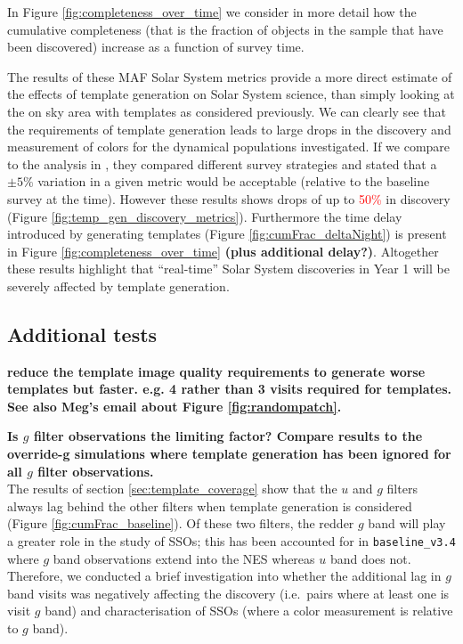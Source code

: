 \documentclass[preprint,linenumbers]{aastex631}
\newcommand{\baseline}{\texttt{baseline\_v3.4}\xspace}
\providecommand{\red}[1]{\textcolor{red}{#1}}
\begin{document}
{		In Figure \ref{fig:completeness_over_time} we consider in more detail how the cumulative completeness (that is the fraction of objects in the sample that have been discovered) increase as a function of survey time.
		
		The results of these MAF Solar System metrics provide a more direct estimate of the effects of template generation on Solar System science, than simply looking at the on sky area with templates as considered previously.
		We can clearly see that the requirements of template generation leads to large drops in the discovery and measurement of colors for the dynamical populations investigated.
		If we compare to the analysis in \cite{schwambTuningLegacySurvey2023}, they compared different survey strategies and stated that a $\pm5\%$ variation in a given metric would be acceptable (relative to the baseline survey at the time).
		However these results shows drops of up to \red{50\%} in discovery (Figure \ref{fig:temp_gen_discovery_metrics}).
		Furthermore the time delay introduced by generating templates (Figure \ref{fig:cumFrac_deltaNight}) is present in Figure \ref{fig:completeness_over_time} \textbf{(plus additional delay?)}.
		Altogether these results highlight that ``real-time'' Solar System discoveries in Year 1 will be severely affected by template generation.
		
		\subsection{Additional tests}
		\label{sec:additional_tests}
		
		\textbf{reduce the template image quality requirements to generate worse templates but faster. e.g. 4 rather than 3 visits required for templates. See also Meg's email about Figure \ref{fig:randompatch}.}
		
		\textbf{Is $g$ filter observations the limiting factor? Compare results to the override-g simulations where template generation has been ignored for all $g$ filter observations.}
		\\
		
		The results of section \ref{sec:template_coverage} show that the $u$ and $g$ filters always lag behind the other filters when template generation is considered (Figure \ref{fig:cumFrac_baseline}).
		Of these two filters, the redder $g$ band will play a greater role in the study of SSOs; this has been accounted for in \baseline where $g$ band observations extend into the NES whereas $u$ band does not.
		Therefore, we conducted a brief investigation into whether the additional lag in $g$ band visits was negatively affecting the discovery (i.e.\ pairs where at least one is visit $g$ band) and characterisation of SSOs (where a color measurement is relative to $g$ band).
		
}
\end{document}
